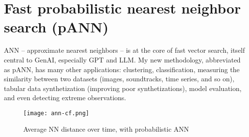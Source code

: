 \documentclass[oneside,10pt]{book}
\begin{document}

\section{Fast probabilistic nearest neighbor search (pANN)}\label{f8v2koyuy}

ANN -- \textcolor{index}{approximate nearest neighbors} --  is at the core of fast 
\textcolor{index}{vector search}, itself central to GenAI, especially GPT and LLM. My new methodology, abbreviated as pANN, has many other applications: clustering, classification, measuring the similarity between two datasets (images, soundtracks, time series, and so on), tabular data synthetization (improving poor synthetizations), model evaluation, and even detecting extreme observations.

\begin{figure}[H]
\centering
\texttt{[image: ann-cf.png]}
\caption{Average NN distance over time, with probabilistic ANN}
\label{fig:gmlp9ut}
\end{figure}
\end{document}
